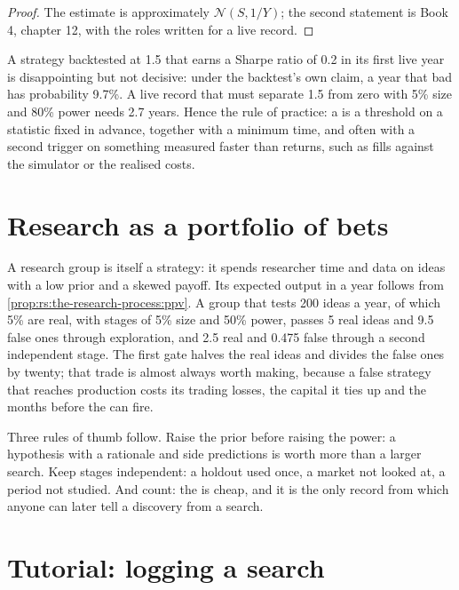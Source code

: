 \begin{proof}
The estimate is approximately $\mathcal N(S, 1/Y)$; the second statement is Book 4, chapter 12, with the roles written for a
live record.
\end{proof}

A strategy backtested at 1.5 that earns a Sharpe ratio of 0.2 in its first live year is disappointing but not decisive:
under the backtest's own claim, a year that bad has probability 9.7\%. A live record that must separate 1.5 from zero with 5\%
size and 80\% power needs 2.7 years. Hence the rule of practice: a  is a threshold on a statistic fixed in
advance, together with a minimum time, and often with a second trigger on something measured faster than returns, such as
fills against the simulator or the realised costs.

\section{Research as a portfolio of bets}

A research group is itself a strategy: it spends researcher time and data on ideas with a low prior and a skewed payoff. Its
expected output in a year follows from \cref{prop:rs:the-research-process:ppv}. A group that tests 200 ideas a year, of which
5\% are real, with stages of 5\% size and 50\% power, passes 5 real ideas and 9.5 false ones through exploration, and 2.5 real
and 0.475 false through a second independent stage. The first gate halves the real ideas and divides the false ones by twenty;
that trade is almost always worth making, because a false strategy that reaches production costs its trading losses, the
capital it ties up and the months before the  can fire.

Three rules of thumb follow. Raise the prior before raising the power: a hypothesis with a rationale and side predictions is
worth more than a larger search. Keep stages independent: a holdout used once, a market not looked at, a period not studied.
And count: the  is cheap, and it is the only record from which anyone can later tell a discovery from a search.

\section{Tutorial: logging a search}\label{tut:rs:the-research-process:log}

